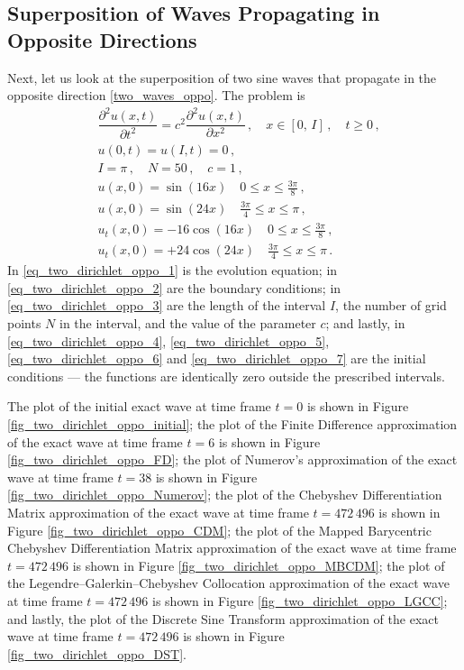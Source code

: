\documentclass[11pt,a4paper,oneside,openright]{report} %
\begin{document}
\subsection{Superposition of Waves Propagating in Opposite Directions}
\noindent
Next, let us look at the superposition of two sine waves that propagate in the opposite direction \eqref{two_waves_oppo}. The problem is
\begin{subequations}\label{}
    \begin{align}
        & \dfrac{\partial^2 u (x, t)}{\partial t^2 } = c^2 \dfrac{\partial^2 u (x, t)}{\partial x^2} \, , \quad x \in [0, \, I] \, , \quad t \geq 0 \, , \label{eq_two_dirichlet_oppo_1} \\[5pt]
        & u(0, t) = u(I, t) = 0 \, , \label{eq_two_dirichlet_oppo_2} \\[5pt]
        & I = \pi \, , \quad N = 50 \, , \quad c = 1 \, , \label{eq_two_dirichlet_oppo_3} \\[5pt]
        & u(x,0) = \sin{(16 x)} \quad 0 \leq x \leq \frac{3\pi}{8} \, , \label{eq_two_dirichlet_oppo_4} \\[5pt]
        & u(x,0) = \sin{(24 x)} \quad \frac{3\pi}{4} \leq x \leq \pi \, , \label{eq_two_dirichlet_oppo_5} \\[5pt]
        & u_t(x,0) = - 16 \cos(16 x) \quad 0 \leq x \leq \frac{3\pi}{8} \,  , \label{eq_two_dirichlet_oppo_6} \\[5pt]
        & u_t(x,0) = + 24 \cos(24 x) \quad \frac{3\pi}{4} \leq x \leq \pi \, \label{eq_two_dirichlet_oppo_7} .
    \end{align}
\end{subequations}
In \eqref{eq_two_dirichlet_oppo_1} is the evolution equation; in \eqref{eq_two_dirichlet_oppo_2} are the boundary conditions; in \eqref{eq_two_dirichlet_oppo_3} are the length of the interval $I$, the number of grid points $N$ in the interval, and the value of the parameter $c$; and lastly, in \ref{eq_two_dirichlet_oppo_4}, \eqref{eq_two_dirichlet_oppo_5}, \eqref{eq_two_dirichlet_oppo_6} and \eqref{eq_two_dirichlet_oppo_7} are the initial conditions — the functions are identically zero outside the prescribed intervals.

The plot of the initial exact wave at time frame $t=0$ is shown in Figure \ref{fig_two_dirichlet_oppo_initial}; the plot of the Finite Difference approximation of the exact wave at time frame $t=6$ is shown in Figure \ref{fig_two_dirichlet_oppo_FD}; the plot of Numerov's approximation of the exact wave at time frame $t=38$ is shown in Figure \ref{fig_two_dirichlet_oppo_Numerov}; the plot of the Chebyshev Differentiation Matrix approximation of the exact wave at time frame $t=472 \, 496$ is shown in Figure \ref{fig_two_dirichlet_oppo_CDM}; the plot of the Mapped Barycentric Chebyshev Differentiation Matrix approximation of the exact wave at time frame $t=472 \, 496$ is shown in Figure \ref{fig_two_dirichlet_oppo_MBCDM}; the plot of the Legendre--Galerkin--Chebyshev Collocation approximation of the exact wave at time frame $t=472 \, 496$ is shown in Figure \ref{fig_two_dirichlet_oppo_LGCC}; and lastly, the plot of the Discrete Sine Transform approximation of the exact wave at time frame $t=472 \, 496$ is shown in Figure \ref{fig_two_dirichlet_oppo_DST}.
\end{document}
